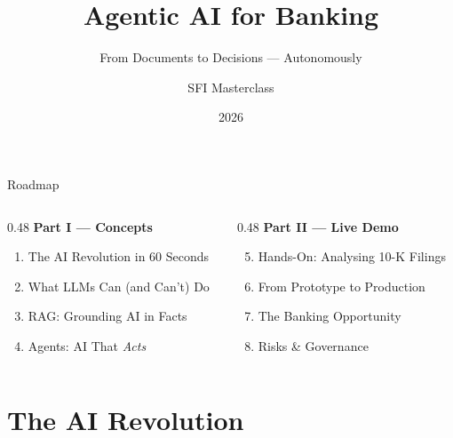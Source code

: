 \documentclass[aspectratio=169,12pt]{beamer}
\title{Agentic AI for Banking}
\subtitle{From Documents to Decisions --- Autonomously}
\author{SFI Masterclass}
\date{2026}
\institute{}
\begin{document}
\begin{frame}[plain]
  \maketitle
\end{frame}

\begin{frame}{Roadmap}
  \begin{columns}[T]
    \begin{column}{0.48\textwidth}
      \textbf{\color{accent} Part I --- Concepts}
      \begin{enumerate}
        \item The AI Revolution in 60 Seconds
        \item What LLMs Can (and Can't) Do
        \item RAG: Grounding AI in Facts
        \item Agents: AI That \emph{Acts}
      \end{enumerate}
    \end{column}
    \begin{column}{0.48\textwidth}
      \textbf{\color{accent2} Part II --- Live Demo}
      \begin{enumerate}\setcounter{enumi}{4}
        \item Hands-On: Analysing 10-K Filings
        \item From Prototype to Production
        \item The Banking Opportunity
        \item Risks \& Governance
      \end{enumerate}
    \end{column}
  \end{columns}
\end{frame}

\section{The AI Revolution}
\end{document}
